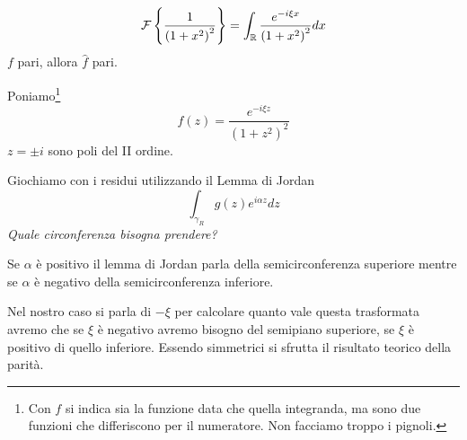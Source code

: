 \begin{equation*}
\mathcal{F} \left\{\frac{1}{\left( 1+x^{2}\right)^{2}}\right\} =\int _{\mathbb{R} }\frac{e^{-i\xi x}}{\left( 1+x^{2}\right)^{2}} dx
\end{equation*}
$f$ pari, allora $\hat{f}$ pari.

Poniamo\footnote{Con $f$ si indica sia la funzione data che quella integranda, ma sono due funzioni che differiscono per il numeratore. Non facciamo troppo i pignoli.}
\begin{equation*}
f( z) =\frac{e^{-i\xi z}}{\left( 1+z^{2}\right)^{2}}
\end{equation*}
$z=\pm i$ sono poli del II ordine.

Giochiamo con i residui utilizzando il Lemma di Jordan
\begin{equation*}
\int _{\gamma _{R}} g( z) e^{i\alpha z} dz
\end{equation*}
\textit{Quale circonferenza bisogna prendere?}

Se $\alpha $ è positivo il lemma di Jordan parla della semicirconferenza superiore mentre se $\alpha $ è negativo della semicirconferenza inferiore.

Nel nostro caso si parla di $-\xi $ per calcolare quanto vale questa trasformata avremo che se $\xi $ è negativo avremo bisogno del semipiano superiore, se $\xi $ è positivo di quello inferiore. Essendo simmetrici si sfrutta il risultato teorico della parità.


